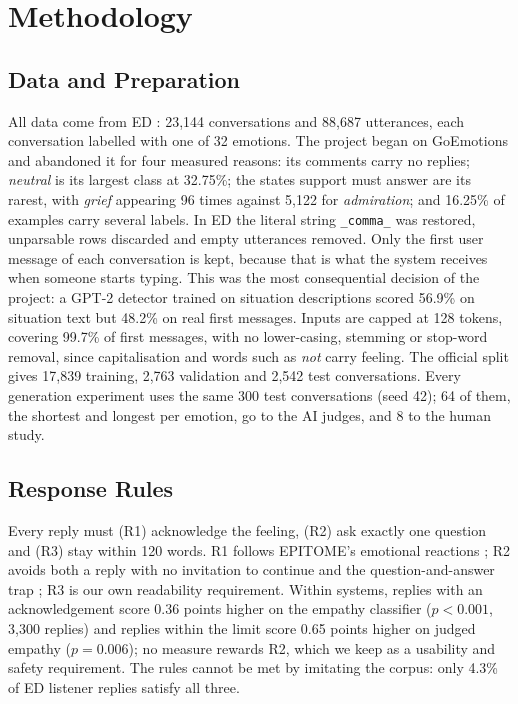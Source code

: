 \documentclass[conference]{IEEEtran}
\begin{document}
\section{Methodology}\label{sec:method}

\subsection{Data and Preparation}
All data come from ED \cite{b20}: 23,144 conversations and 88,687 utterances, each conversation labelled with one of 32 emotions. The project began on GoEmotions \cite{b37} and abandoned it for four measured reasons: its comments carry no replies; \textit{neutral} is its largest class at 32.75\%; the states support must answer are its rarest, with \textit{grief} appearing 96 times against 5,122 for \textit{admiration}; and 16.25\% of examples carry several labels. In ED the literal string \texttt{\_comma\_} was restored, unparsable rows discarded and empty utterances removed. Only the first user message of each conversation is kept, because that is what the system receives when someone starts typing. This was the most consequential decision of the project: a GPT-2 detector trained on situation descriptions scored 56.9\% on situation text but 48.2\% on real first messages. Inputs are capped at 128 tokens, covering 99.7\% of first messages, with no lower-casing, stemming or stop-word removal, since capitalisation and words such as \textit{not} carry feeling. The official split gives 17,839 training, 2,763 validation and 2,542 test conversations. Every generation experiment uses the same 300 test conversations (seed 42); 64 of them, the shortest and longest per emotion, go to the AI judges, and 8 to the human study.

\subsection{Response Rules}
Every reply must (R1) acknowledge the feeling, (R2) ask exactly one question and (R3) stay within 120 words. R1 follows EPITOME's emotional reactions \cite{b2}; R2 avoids both a reply with no invitation to continue and the question-and-answer trap \cite{b3}; R3 is our own readability requirement. Within systems, replies with an acknowledgement score 0.36 points higher on the empathy classifier ($p<0.001$, 3,300 replies) and replies within the limit score 0.65 points higher on judged empathy ($p=0.006$); no measure rewards R2, which we keep as a usability and safety requirement. The rules cannot be met by imitating the corpus: only 4.3\% of ED listener replies satisfy all three.
\end{document}
